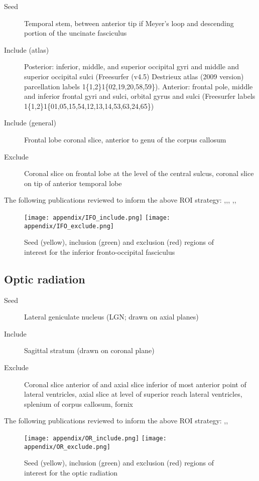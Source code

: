 \begin{description}
  \item[Seed] Temporal stem, between anterior tip if Meyer's loop and descending portion of the uncinate fasciculus
  \item[Include (atlas)] Posterior: inferior, middle, and superior occipital gyri and middle and superior occipital sulci (Freesurfer (v4.5) Destrieux atlas\autocite{Destrieux2010} (2009 version) parcellation labels 1\{1,2\}1\{02,19,20,58,59\}).
  Anterior: frontal pole, middle and inferior frontal gyri and sulci, orbital gyrus and sulci (Freesurfer labels 1\{1,2\}1\{01,05,15,54,12,13,14,53,63,24,65\})
  \item[Include (general)] Frontal lobe coronal slice, anterior to genu of the corpus callosum
  \item[Exclude] Coronal slice on frontal lobe at the level of the central sulcus, coronal slice on tip of anterior temporal lobe
\end{description}

The following publications reviewed to inform the above ROI strategy: \textcite{Martino2010},\textcite{Sarubbo2013},\textcite{Hau2016},
\textcite{Catani2008},\textcite{Wakana2007},\textcite{Wu2016}

\begin{figure*}[h]
  \centering
    \texttt{[image: appendix/IFO\_include.png]}
    \texttt{[image: appendix/IFO\_exclude.png]}
  \caption{Seed (yellow), inclusion (green) and exclusion (red) regions of interest for the inferior fronto-occipital fasciculus}
  \label{fig:rois.ifo}
\end{figure*}

\subsection{Optic radiation}

\begin{description}
  \item[Seed] Lateral geniculate nucleus (LGN; drawn on axial planes)
  \item[Include] Sagittal stratum (drawn on coronal plane)
  \item[Exclude] Coronal slice anterior of and axial slice inferior of most anterior point of lateral ventricles, axial slice at level of superior reach lateral ventricles, splenium of corpus callosum, fornix
\end{description}

The following publications reviewed to inform the above ROI strategy:
\textcite{Yogarajah2009},\textcite{Hofer2010},\textcite{Dayan2015}

\begin{figure*}[h]
  \centering
    \texttt{[image: appendix/OR\_include.png]}
    \texttt{[image: appendix/OR\_exclude.png]}
  \caption{Seed (yellow), inclusion (green) and exclusion (red) regions of interest for the optic radiation}
  \label{fig:rois.or}
\end{figure*}
